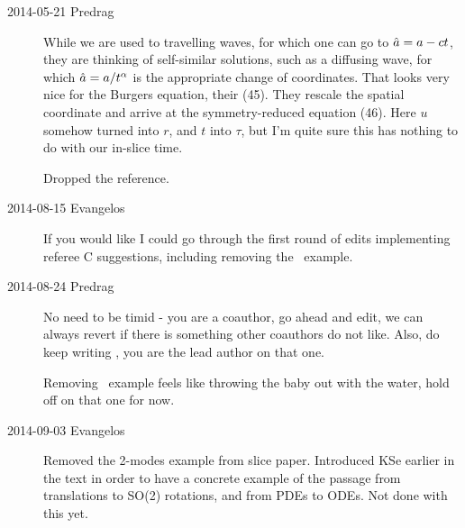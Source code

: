 \begin{description}
\item[2014-05-21 Predrag] While we are used to travelling waves,
for which one can go to $\hat{a}=a-c t$, they are thinking of
self-similar solutions, such as a diffusing wave, for which
$\hat{a}=a/t^\alpha$ is the appropriate change of coordinates.
That looks very nice for the Burgers equation, their (45). They rescale
the spatial coordinate and arrive at the symmetry-reduced equation (46).
Here $u$ somehow turned into $r$, and $t$ into $\tau$, but I'm quite sure
this has nothing to do with our in-slice time.

Dropped the reference.

%


\item[2014-08-15 Evangelos]
If you would like I could go through the first round of edits
implementing referee C suggestions, including removing the \twomode\
example.

\item[2014-08-24 Predrag]
No need to be timid - you are a coauthor, go ahead and edit, we can
always revert if there is something other coauthors do not like. Also, do
keep writing \refref{SCD09b}, you are the lead author on that one.

Removing \twomode\ example feels like throwing the baby out with the
water, hold off on that one for now.

\item[2014-09-03 Evangelos] Removed the 2-modes example from slice paper.
Introduced KSe earlier in the text in order to have a concrete example
of the passage from translations to SO(2) rotations, and from PDEs to ODEs.
Not done with this yet.


\end{description}
